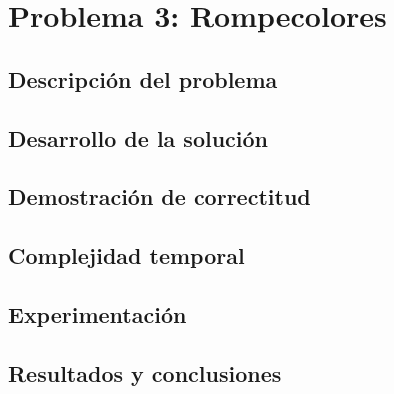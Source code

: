\documentclass[a4paper, 10pt, twoside]{article}
\begin{document}
\newpage



\section{Problema 3: Rompecolores}

\subsection{Descripción del problema}


\subsection{Desarrollo de la solución}


\subsection{Demostración de correctitud}


\subsection{Complejidad temporal}


\subsection{Experimentación}


\subsection{Resultados y conclusiones}


\newpage



\begin{appendices}



\end{appendices}
\end{document}
